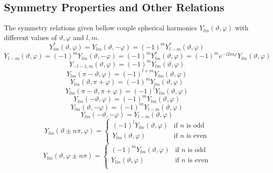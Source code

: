 \subsection[Symmetry Properties ...]{Symmetry Properties and Other Relations}
\par{The symmetry relations given bellow couple spherical harmonics
  $Y_{lm}(\vartheta,\varphi)$ with different values of $\vartheta,\varphi$ and
  $l,m$.}
\begin{equation}
Y_{lm}^{*}(\vartheta,\varphi)=Y_{lm}(\vartheta,-\varphi)=(-1)^mY_{l-m}^{*}(\vartheta,\varphi)
\end{equation}
\begin{equation}
Y_{l-m}(\vartheta,\varphi)=(-1)^mY_{lm}(\vartheta,-\varphi)=(-1)^mY_{lm}^{*}(\vartheta,\varphi)=(-1)^me^{-i2m\varphi}Y_{lm}(\vartheta,\varphi)
\end{equation}
\begin{equation}
Y_{-l-1,m}(\vartheta,\varphi)=(-1)^mY_{lm}(\vartheta,\varphi)
\end{equation}
\begin{equation}
Y_{lm}(\pi-\vartheta,\varphi)=(-1)^{l+m}Y_{lm}(\vartheta,\varphi)
\end{equation}
\begin{equation}
Y_{lm}(\vartheta,\pi+\varphi)=(-1)^mY_{lm}(\vartheta,\varphi)
\end{equation}
\begin{equation}
Y_{lm}(\pi-\vartheta,\pi+\varphi)=(-1)^lY_{lm}(\vartheta,\varphi)
\end{equation}
\begin{equation}
Y_{lm}(-\vartheta,\varphi)=(-1)^mY_{lm}(\vartheta,\varphi)
\end{equation}
\begin{equation}
Y_{lm}(\vartheta,-\varphi)=(-1)^mY_{l-m}(\vartheta,\varphi)
\end{equation}
\begin{equation}
Y_{lm}(-\vartheta,-\varphi)=Y_{l-m}(\vartheta,\varphi)
\end{equation}
\begin{equation}
Y_{lm}(\vartheta \pm n\pi,\varphi)=\left\{ \begin{array}{lc}
(-1)^lY_{lm}(\vartheta,\varphi) & \text{if }n \text{ is odd}\\
Y_{lm}(\vartheta,\varphi) & \text{if }n \text{ is even}\\
\end{array}
\right.
\end{equation}
\begin{equation}
Y_{lm}(\vartheta,\varphi \pm n\pi)=\left\{ \begin{array}{lc}
(-1)^mY_{lm}(\vartheta,\varphi) & \text{if }n \text{ is odd}\\
Y_{lm}(\vartheta,\varphi) & \text{if }n \text{ is even}\\
\end{array}
\right.
\end{equation}

